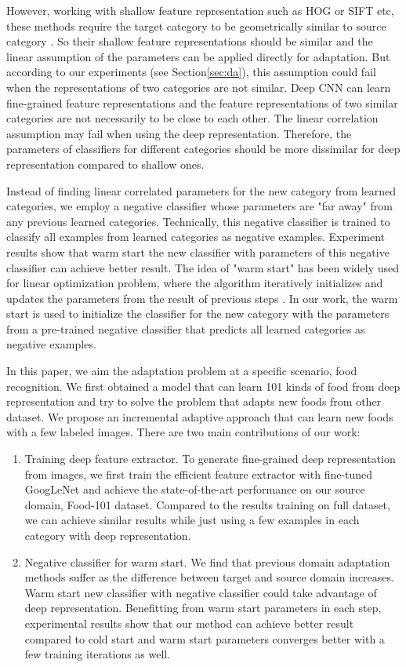 However, working with shallow feature representation such as HOG or SIFT etc, these methods require the target category to be geometrically similar to source category \cite{aytar2011tabula}. So their shallow feature representations should be similar and the linear assumption of the parameters can be applied directly for adaptation. But according to our experiments (see Section\ref{sec:da}), this assumption could fail when the representations of two categories are not similar.
Deep CNN can learn fine-grained feature representations and the feature representations of two similar categories are not necessarily to be close to each other. The linear correlation assumption may fail when using the deep representation. Therefore, the parameters of classifiers for different categories should be more dissimilar for deep representation compared to shallow ones.

Instead of finding linear correlated parameters for the new category from learned categories, we employ a negative classifier whose parameters are "far away" from any previous learned categories. Technically, this negative classifier is trained to classify all examples from learned categories as negative examples. Experiment results show that warm start the new classifier with parameters of this negative classifier can achieve better result. The idea of "warm start" has been widely used for linear optimization problem, where the algorithm iteratively initializes and updates the parameters from the result of previous steps \cite{yildirim2002warm} \cite{john2008implementation} \cite{zeilinger2011real} \cite{chuwarm}. In our work, the warm start is used to initialize the classifier for the new category with the parameters from a pre-trained negative classifier that predicts all learned categories as negative examples.

In this paper, we aim the adaptation problem at a specific scenario, food recognition. We first obtained a model that can learn 101 kinds of food from deep representation and try to solve the problem that adapts new foods from other dataset. We propose an incremental adaptive approach that can learn new foods with a few labeled images. There are two main contributions of our work:
\begin{enumerate}
  \item Training deep feature extractor. To generate fine-grained deep representation from images, we first train the efficient feature extractor with fine-tuned GoogLeNet and achieve the state-of-the-art performance on our source domain, Food-101 dataset. Compared to the results training on full dataset, we can achieve similar results while just using a few examples in each category with deep representation.
  \item Negative classifier for warm start. We find that previous domain adaptation methods suffer as the difference between target and source domain increases. Warm start new classifier with negative classifier could take advantage of deep representation. Benefitting from warm start parameters in each step, experimental results show that our method can achieve better result compared to cold start and warm start parameters converges better with a few training iterations as well.
\end{enumerate}

